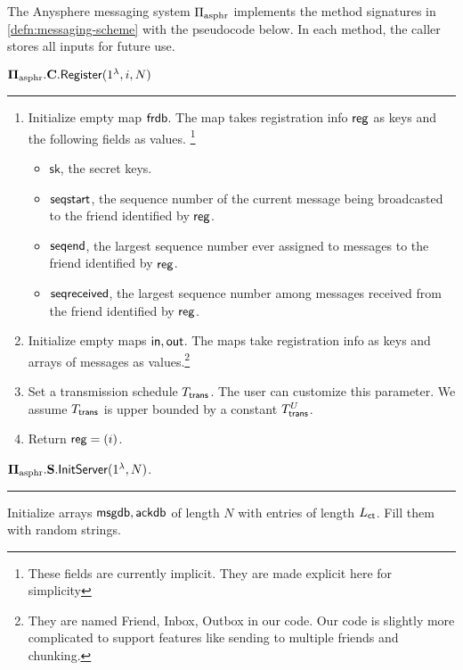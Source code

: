 \begin{definition}
\label{defn:asphr-code}
The Anysphere messaging system $\Pi_{\text{asphr}}$ implements the method signatures in \cref{defn:messaging-scheme} with the pseudocode below. In each method, the caller stores all inputs for future use.
\vspace{10pt}

$\mathbf{\Pi_{\text{asphr}}.C.\mathsf{Register}}(1^{\lambda}, i, N)$
\vspace{5pt}
\hrule
\vspace{5pt}
\begin{enumerate}
    \item Initialize empty map $\mathsf{frdb}$. The map takes registration info $\mathsf{reg}$ as keys and the following fields as values.    \footnote{These fields are currently implicit. They are made explicit here for simplicity}
    \begin{itemize}
        \item $\mathsf{sk}$, the secret keys.
        \item $\mathsf{seqstart}$, the sequence number of the current message being broadcasted to the friend identified by $\mathsf{reg}$.
        \item $\mathsf{seqend}$, the largest sequence number ever assigned to messages to the friend identified by $\mathsf{reg}$.
        \item $\mathsf{seqreceived}$, the largest sequence number among messages received from the friend identified by $\mathsf{reg}$.
    \end{itemize}

    \item Initialize empty maps $\mathsf{in}, \mathsf{out}$. The maps take registration info as keys and arrays of messages as values.\footnote{They are named Friend, Inbox, Outbox in our code. Our code is slightly more complicated to support features like sending to multiple friends and chunking.}
    \item Set a transmission schedule $T_{\mathsf{trans}}$. The user can customize this parameter. We assume $T_{\mathsf{trans}}$ is upper bounded by a constant $T_{\mathsf{trans}}^U$.
    \item Return $\mathsf{reg} = (i)$.
\end{enumerate}
\vspace{10pt}
$\mathbf{\Pi_{\text{asphr}}.S.\mathsf{InitServer}}(1^{\lambda}, N)$.
\vspace{5pt}
\hrule
\vspace{5pt}
Initialize arrays $\mathsf{msgdb}, \mathsf{ackdb}$ of length $N$ with entries of length $L_{\mathsf{ct}}$. Fill them with random strings.


\end{definition}

